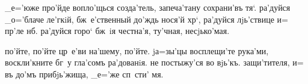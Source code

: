 _е='юже про'йде вопло'щься созда'тель, запеча'тану 
сохрани'въ тя`. ра'дуйся _о='блаче ле'гкiй, бж~е'ственный 
до'ждь нося'й хр`, ра'дуйся лjь'ствице и= пр'ле 
нб. ра'дуйся горо` бж~iя честна'я, ту'чная, 
несjько'мая.

по'йте, по'йте цр~е'ви на'шему, по'йте. %
jа=зы'цы восплещи'те рука'ми, воскли'кните бг~у гла'сомъ 
ра'дованiя. %
не постыжу'ся во вjь'къ. %
защи'тителя, и= въ до'мъ прибjь'жища, _е='же сп~сти' мя.

